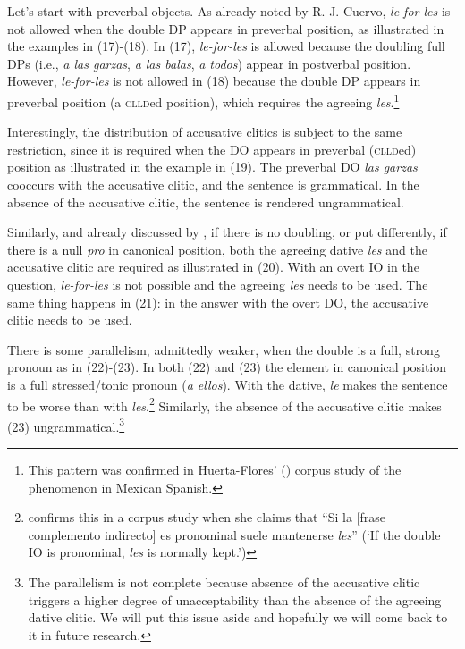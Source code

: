 \documentclass[output=paper,colorlinks,citecolor=brown,
]{langscibook}
\begin{document}
Let’s start with preverbal objects. As already noted by R. J. Cuervo, \textit{le-for-les} is not allowed when the double DP appears in preverbal position, as illustrated in the examples in (17)-(18). In (17), \textit{le-for-les} is allowed because the doubling full DPs (i.e., \textit{a las garzas}, \textit{a las balas}, \textit{a todos}) appear in postverbal position. However, \textit{le-for-les} is not allowed in (18) because the double DP appears in preverbal position (a \textsc{clld}ed position), which requires the agreeing \textit{les}.\footnote{\textrm{ This pattern was confirmed in Huerta-Flores’ (\citeyear{huerta2005}) corpus study of the phenomenon in Mexican Spanish.}} 




Interestingly, the distribution of accusative clitics is subject to the same restriction, since it is required when the DO appears in preverbal (\textsc{clld}ed) position as illustrated in the example in (19). The preverbal DO \textit{las garzas} cooccurs with the accusative clitic, and the sentence is grammatical. In the absence of the accusative clitic, the sentence is rendered ungrammatical. 




Similarly, and already discussed by \citet{casares1918}, if there is no doubling, or put differently, if there is a null \textit{pro} in canonical position, both the agreeing dative \textit{les} and the accusative clitic are required as illustrated in (20). With an overt IO in the question, \textit{le-for-les} is not possible and the agreeing \textit{les} needs to be used. The same thing happens in (21): in the answer with the overt DO, the accusative clitic needs to be used.




There is some parallelism, admittedly weaker, when the double is a full, strong pronoun as in (22)-(23). In both (22) and (23) the element in canonical position is a full stressed/tonic pronoun (\textit{a ellos}). With the dative, \textit{le }makes the sentence to be worse than with \textit{les}.\footnote{\textrm{ \citet[67]{arechalde1992} confirms this in a corpus study when she claims that “Si la [frase complemento indirecto] es pronominal suele mantenerse }\textrm{\textit{les}}\textrm{” (‘If the double IO is pronominal, }\textrm{\textit{les}}\textrm{ is normally kept.’)}} Similarly, the absence of the accusative clitic makes (23) ungrammatical.\footnote{\textrm{ The parallelism is not complete because absence of the accusative clitic triggers a higher degree of unacceptability than the absence of the agreeing dative clitic. We will put this issue aside and hopefully we will come back to it in future research.}}
\end{document}
